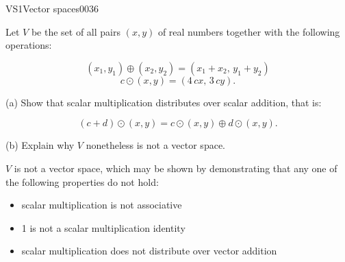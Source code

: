 \begin{exercise}{VS1}{Vector spaces}{0036} 
\begin{exerciseStatement} 

 Let \(V\) be the set of all pairs \((x,y)\) of real numbers together with the following operations: 

 \[(x_1,y_1)\oplus (x_2,y_2)=\left(x_{1} + x_{2},\,y_{1} + y_{2}\right)\]\[c \odot (x,y) =\left(4 \, c x,\,3 \, c y\right).\] 

 (a) Show that scalar multiplication distributes over scalar addition, that is: 

 \[
      (c+d)\odot(x,y)=c\odot(x,y)\oplus d\odot (x,y).
    \] 

 (b) Explain why \(V\) nonetheless is not a vector space. 

 \end{exerciseStatement}
 \begin{exerciseAnswer} 

 \(V\) is not a vector space, which may be shown by demonstrating that any one of the following properties do not hold: 

 

\begin{itemize}
\item scalar multiplication is not associative
\item 1 is not a scalar multiplication identity
\item scalar multiplication does not distribute over vector addition
\end{itemize}

     \end{exerciseAnswer}
 \end{exercise}


\newpage




